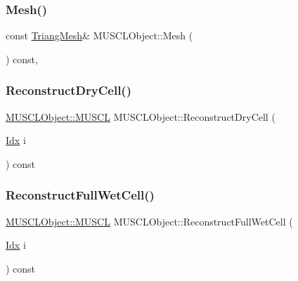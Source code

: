 \mbox{\label{structMUSCLObject_a5761f77d8e701b065f3744cb56cae12a}} 
\subsubsection{\texorpdfstring{Mesh()}{Mesh()}}
{\footnotesize\ttfamily const \hyperlink{structTriangMesh}{Triang\+Mesh}\& M\+U\+S\+C\+L\+Object\+::\+Mesh (\begin{DoxyParamCaption}{ }\end{DoxyParamCaption}) const\hspace{0.3cm}{\ttfamily [inline]}, {\ttfamily [noexcept]}}

\mbox{\label{structMUSCLObject_addbf4dabcb3c632f5550cb38db0bd1cd}} 
\subsubsection{\texorpdfstring{Reconstruct\+Dry\+Cell()}{ReconstructDryCell()}}
{\footnotesize\ttfamily \hyperlink{structMUSCLObject_1_1MUSCL}{M\+U\+S\+C\+L\+Object\+::\+M\+U\+S\+CL} M\+U\+S\+C\+L\+Object\+::\+Reconstruct\+Dry\+Cell (\begin{DoxyParamCaption}\item[{\hyperlink{Includes_8h_ae78891cd308078a2f5f9e7193065c805}{Idx}}]{i }\end{DoxyParamCaption}) const\hspace{0.3cm}{\ttfamily [protected]}}

\mbox{\label{structMUSCLObject_a529e679b99f1bc7daf3db9aa1389b1fe}} 
\subsubsection{\texorpdfstring{Reconstruct\+Full\+Wet\+Cell()}{ReconstructFullWetCell()}}
{\footnotesize\ttfamily \hyperlink{structMUSCLObject_1_1MUSCL}{M\+U\+S\+C\+L\+Object\+::\+M\+U\+S\+CL} M\+U\+S\+C\+L\+Object\+::\+Reconstruct\+Full\+Wet\+Cell (\begin{DoxyParamCaption}\item[{\hyperlink{Includes_8h_ae78891cd308078a2f5f9e7193065c805}{Idx}}]{i }\end{DoxyParamCaption}) const\hspace{0.3cm}{\ttfamily [protected]}}

